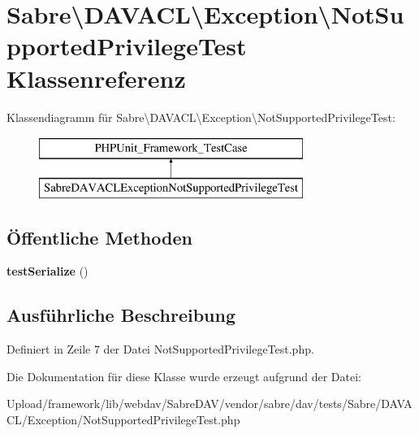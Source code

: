\hypertarget{class_sabre_1_1_d_a_v_a_c_l_1_1_exception_1_1_not_supported_privilege_test}{}\section{Sabre\textbackslash{}D\+A\+V\+A\+CL\textbackslash{}Exception\textbackslash{}Not\+Supported\+Privilege\+Test Klassenreferenz}
\label{class_sabre_1_1_d_a_v_a_c_l_1_1_exception_1_1_not_supported_privilege_test}
Klassendiagramm für Sabre\textbackslash{}D\+A\+V\+A\+CL\textbackslash{}Exception\textbackslash{}Not\+Supported\+Privilege\+Test\+:\begin{figure}[H]
\begin{center}
\leavevmode
\includegraphics[height=2.000000cm]{class_sabre_1_1_d_a_v_a_c_l_1_1_exception_1_1_not_supported_privilege_test}
\end{center}
\end{figure}
\subsection*{Öffentliche Methoden}
\begin{DoxyCompactItemize}
\item 
\mbox{\label{class_sabre_1_1_d_a_v_a_c_l_1_1_exception_1_1_not_supported_privilege_test_a1c7b03ca00083e7d499a43293c7e3808}} 
{\bfseries test\+Serialize} ()
\end{DoxyCompactItemize}


\subsection{Ausführliche Beschreibung}


Definiert in Zeile 7 der Datei Not\+Supported\+Privilege\+Test.\+php.



Die Dokumentation für diese Klasse wurde erzeugt aufgrund der Datei\+:\begin{DoxyCompactItemize}
\item 
Upload/framework/lib/webdav/\+Sabre\+D\+A\+V/vendor/sabre/dav/tests/\+Sabre/\+D\+A\+V\+A\+C\+L/\+Exception/Not\+Supported\+Privilege\+Test.\+php\end{DoxyCompactItemize}
